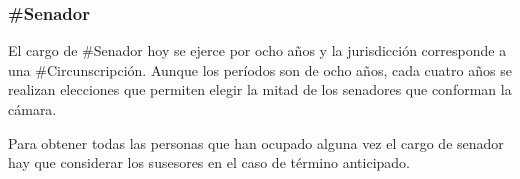 \subsubsection{\#Senador}

El cargo de \#Senador hoy se ejerce por ocho años y la jurisdicción
corresponde a una \#Circunscripción. Aunque los períodos son de ocho
años, cada cuatro años se realizan elecciones que permiten elegir la
mitad de los senadores que conforman la cámara.

Para obtener todas las personas que han ocupado alguna vez el cargo de
senador hay que considerar los susesores en el caso de término
anticipado.

\begin{description}
  
\end{description}
